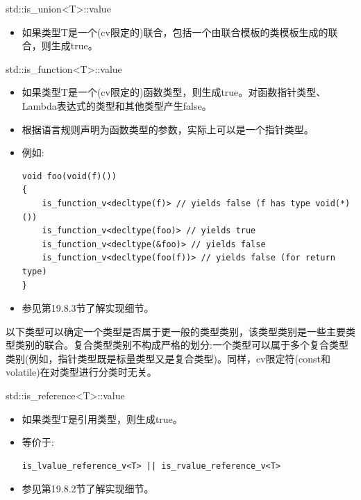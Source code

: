 std::is\_union<T>::value

\begin{itemize}
\item 
如果类型T是一个(cv限定的)联合，包括一个由联合模板的类模板生成的联合，则生成true。
\end{itemize}

std::is\_function<T>::value

\begin{itemize}
\item 
如果类型T是一个(cv限定的)函数类型，则生成true。对函数指针类型、Lambda表达式的类型和其他类型产生false。

\item 
根据语言规则声明为函数类型的参数，实际上可以是一个指针类型。

\item 
例如:
\begin{lstlisting}[style=styleCXX]
void foo(void(f)())
{
	is_function_v<decltype(f)> // yields false (f has type void(*)())
	is_function_v<decltype(foo)> // yields true
	is_function_v<decltype(&foo)> // yields false
	is_function_v<decltype(foo(f))> // yields false (for return type)
}
\end{lstlisting}

\item 
参见第19.8.3节了解实现细节。
\end{itemize}


以下类型可以确定一个类型是否属于更一般的类型类别，该类型类别是一些主要类型类别的联合。复合类型类别不构成严格的划分:一个类型可以属于多个复合类型类别(例如，指针类型既是标量类型又是复合类型)。同样，cv限定符(const和volatile)在对类型进行分类时无关。

std::is\_reference<T>::value

\begin{itemize}
\item 
如果类型T是引用类型，则生成true。

\item 
等价于: 
\begin{lstlisting}[style=styleCXX]
is_lvalue_reference_v<T> || is_rvalue_reference_v<T>
\end{lstlisting}

\item 
参见第19.8.2节了解实现细节。
\end{itemize}


